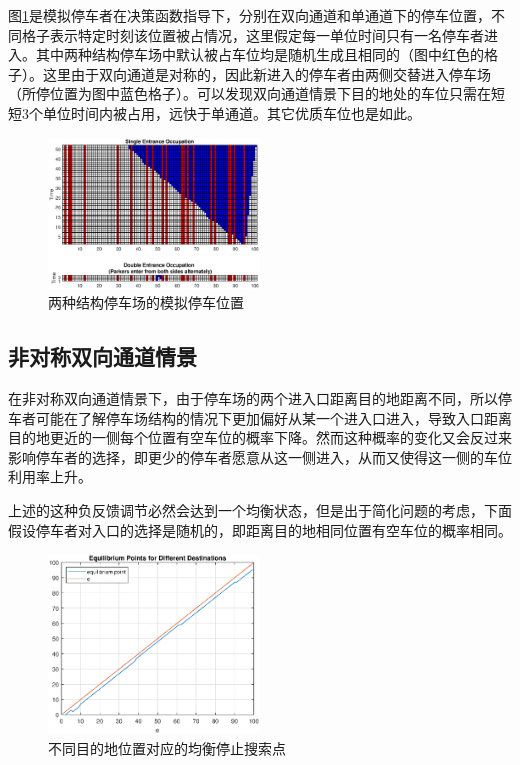 \documentclass{thuemp}
\begin{document}
\par 图\ref{fig:7}是模拟停车者在决策函数指导下，分别在双向通道和单通道下的停车位置，不同格子表示特定时刻该位置被占情况，这里假定每一单位时间只有一名停车者进入。其中两种结构停车场中默认被占车位均是随机生成且相同的（图中红色的格子）。这里由于双向通道是对称的，因此新进入的停车者由两侧交替进入停车场（所停位置为图中蓝色格子）。可以发现双向通道情景下目的地处的车位只需在短短3个单位时间内被占用，远快于单通道。其它优质车位也是如此。

\begin{figure}[H]
    \centering
    \includegraphics[width=0.5\textwidth]{occupation.eps}
    \caption{两种结构停车场的模拟停车位置}
    \label{fig:7}
\end{figure}

\subsection{非对称双向通道情景}
\par 在非对称双向通道情景下，由于停车场的两个进入口距离目的地距离不同，所以停车者可能在了解停车场结构的情况下更加偏好从某一个进入口进入，导致入口距离目的地更近的一侧每个位置有空车位的概率下降。然而这种概率的变化又会反过来影响停车者的选择，即更少的停车者愿意从这一侧进入，从而又使得这一侧的车位利用率上升。
\par 上述的这种负反馈调节必然会达到一个均衡状态，但是出于简化问题的考虑，下面假设停车者对入口的选择是随机的，即距离目的地相同位置有空车位的概率相同。

\begin{figure}[H]
    \centering
    \includegraphics[width=0.5\textwidth]{asymmetric_eq_to_e.eps}
    \caption{不同目的地位置对应的均衡停止搜索点}
    \label{fig:8}
\end{figure}
\end{document}
